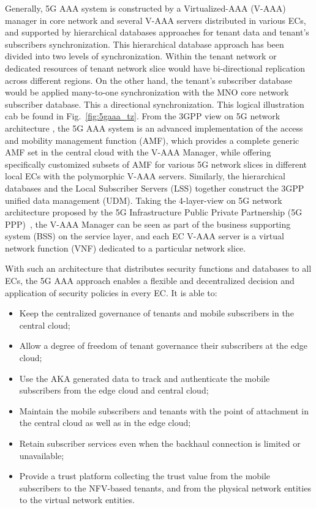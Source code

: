 \documentclass{ieeeaccess}
\newcommand{\change}[1]{#1}
\begin{document}
	Generally, 5G AAA system is constructed by a \change{V}irtualized-AAA (V-AAA) manager in core network and several V-AAA servers distributed in various ECs, and supported by hierarchical databases approaches for tenant data and tenant's subscribers synchronization. This hierarchical database approach has been divided into two levels of synchronization. Within the tenant network or dedicated resources of tenant network slice would have bi-directional replication across different regions. On the other hand, the tenant's subscriber database would be applied many-to-one synchronization with the MNO core network subscriber database. This a directional synchronization. This logical illustration cab be found in Fig.~\ref{fig:5gaaa_tz}. From the 3GPP view on 5G network architecture \cite{3gpp2017system}, the 5G AAA system is an advanced implementation of the access and mobility management function (AMF), which provides a complete generic AMF set in the central cloud with the V-AAA Manager, while offering specifically customized subsets of AMF for various 5G network slices in different local ECs with the polymorphic V-AAA servers. Similarly, the hierarchical databases and the Local Subscriber Servers (LSS) together construct the 3GPP unified data management (UDM). Taking the 4-layer-view on 5G network architecture proposed by the 5G Infrastructure Public Private Partnership (5G PPP)~\cite{5gppp2016white}, the V-AAA Manager can be seen as part of the business supporting system (BSS) on the service layer, and each EC V-AAA server is a virtual network function (VNF) dedicated to a particular network slice.  
	
	With such an architecture that distributes security functions and databases to all ECs, the 5G AAA approach enables a flexible and decentralized decision and application of security policies in every EC. It is able to:
	\begin{itemize}
		\item Keep the centralized governance of tenants and mobile subscribers in the central cloud;
		\item Allow a degree of freedom of tenant governance their subscribers at the edge cloud;
		\item Use the AKA generated data to track and authenticate the mobile subscribers from the edge cloud and central cloud;
		\item Maintain the mobile subscribers and tenants with the point of attachment in the central cloud as well as in the edge cloud;
		\item \change{Retain} subscriber services even when the backhaul connection is limited or unavailable;
		\item Provide a trust platform collecting the trust value from the mobile subscribers to the NFV-based tenants, and from the physical network entities to the virtual network entities.
	\end{itemize}
	
\end{document}
